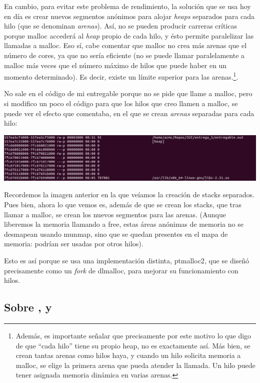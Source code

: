 \documentclass[a4paper]{article}
\begin{document}
En cambio, para evitar este problema de rendimiento, la solución que se usa hoy en día es crear nuevos segmentos anónimos para alojar \emph{heaps} separados para cada hilo (que se denominan \emph{arenas}). Así, no se pueden producir carreras críticas porque {\ttfamily malloc} accederá al \emph{heap} propio de cada hilo, y ésto permite paralelizar las llamadas a {\ttfamily malloc}. Eso sí, cabe comentar que {\ttfamily malloc} no crea más arenas que el número de cores, ya que no sería eficiente (no se puede llamar paralelamente a {\ttfamily malloc} más veces que el número máximo de hilos que puede haber en un momento determinado). Es decir, existe un límite superior para las arenas.\footnote{Además, es importante señalar que precisamente por este motivo lo que digo de que ``cada hilo'' tiene su propio heap, no es exactamente así. Más bien, se crean tantas arenas como hilos haya, y cuando un hilo solicita memoria a {\ttfamily malloc}, se elige la primera arena que pueda atender la llamada. Un hilo puede tener asignada memoria dinámica en varias arenas.}.

No sale en el código de mi entregable porque no se pide que llame a {\ttfamily malloc}, pero si modifico un poco el código para que los hilos que creo llamen a {\ttfamily malloc}, se puede ver el efecto que comentaba, en el que se crean \emph{arenas} separadas para cada hilo:

\includegraphics[scale=0.407]{Hilos_con_malloc.png}

Recordemos la imagen anterior en la que veíamos la creación de stacks separados. Pues bien, ahora lo que vemos es, además de que se crean los stacks, que tras llamar a {\ttfamily malloc}, se crean los nuevos segmentos para las arenas. (Aunque liberemos la memoria llamando a {\ttfamily free}, estas áreas anónimas de memoria no se desmapean usando {\ttfamily munmap}, sino que se quedan presentes en el mapa de memoria: podrían ser usadas por otros hilos).

Esto es así porque se usa una implementación distinta, {\ttfamily ptmalloc2}, que se diseñó precisamente como un \emph{fork} de {\ttfamily dlmalloc}, para mejorar su funcionamiento con hilos.

\subsection{Sobre {\ttfamily [vsyscall]}, {\ttfamily [vdso]} y {\ttfamily [vvar]}}
\end{document}
